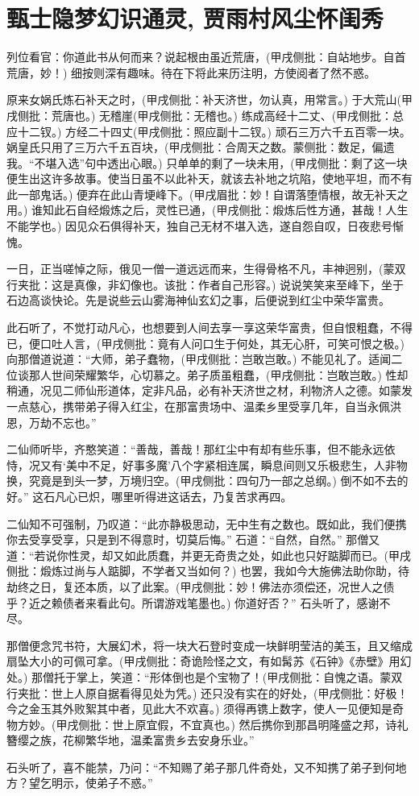 \chapter{甄士隐梦幻识通灵, 贾雨村风尘怀闺秀}

列位看官：你道此书从何而来？说起根由虽近荒唐，(甲戌侧批：自站地步。自首荒唐，妙！) 细按则深有趣味。待在下将此来历注明，方使阅者了然不惑。

原来女娲氏炼石补天之时，(甲戌侧批：补天济世，勿认真，用常言。) 于大荒山(甲戌侧批：荒唐也。) 无稽崖(甲戌侧批：无稽也。) 练成高经十二丈、(甲戌侧批：总应十二钗。) 方经二十四丈(甲戌侧批：照应副十二钗。) 顽石三万六千五百零一块。娲皇氏只用了三万六千五百块，(甲戌侧批：合周天之数。蒙侧批：数足，偏遗我。“不堪入选”句中透出心眼。) 只单单的剩了一块未用，(甲戌侧批：剩了这一块便生出这许多故事。使当日虽不以此补天，就该去补地之坑陷，使地平坦，而不有此一部鬼话。) 便弃在此山青埂峰下。(甲戌眉批：妙！自谓落堕情根，故无补天之用。) 谁知此石自经煅炼之后，灵性已通，(甲戌侧批：煅炼后性方通，甚哉！人生不能学也。) 因见众石俱得补天，独自己无材不堪入选，遂自怨自叹，日夜悲号惭愧。

一日，正当嗟悼之际，俄见一僧一道远远而来，生得骨格不凡，丰神迥别，(蒙双行夹批：这是真像，非幻像也。该批：作者自己形容。) 说说笑笑来至峰下，坐于石边高谈快论。先是说些云山雾海神仙玄幻之事，后便说到红尘中荣华富贵。

此石听了，不觉打动凡心，也想要到人间去享一享这荣华富贵，但自恨粗蠢，不得已，便口吐人言，(甲戌侧批：竟有人问口生于何处，其无心肝，可笑可恨之极。) 向那僧道说道：“大师，弟子蠢物，(甲戌侧批：岂敢岂敢。) 不能见礼了。适闻二位谈那人世间荣耀繁华，心切慕之。弟子质虽粗蠢，(甲戌侧批：岂敢岂敢。) 性却稍通，况见二师仙形道体，定非凡品，必有补天济世之材，利物济人之德。如蒙发一点慈心，携带弟子得入红尘，在那富贵场中、温柔乡里受享几年，自当永佩洪恩，万劫不忘也。”

二仙师听毕，齐憨笑道：“善哉，善哉！那红尘中有却有些乐事，但不能永远依恃，况又有‘美中不足，好事多魔’八个字紧相连属，瞬息间则又乐极悲生，人非物换，究竟是到头一梦，万境归空。(甲戌侧批：四句乃一部之总纲。) 倒不如不去的好。” 这石凡心已炽，哪里听得进这话去，乃复苦求再四。

二仙知不可强制，乃叹道：“此亦静极思动，无中生有之数也。既如此，我们便携你去受享受享，只是到不得意时，切莫后悔。” 石道：“自然，自然。” 那僧又道：“若说你性灵，却又如此质蠢，并更无奇贵之处，如此也只好踮脚而已。(甲戌侧批：煅炼过尚与人踮脚，不学者又当如何？) 也罢，我如今大施佛法助你助，待劫终之日，复还本质，以了此案。(甲戌侧批：妙！佛法亦须偿还，况世人之债乎？近之赖债者来看此句。所谓游戏笔墨也。) 你道好否？” 石头听了，感谢不尽。

那僧便念咒书符，大展幻术，将一块大石登时变成一块鲜明莹洁的美玉，且又缩成扇坠大小的可佩可拿。(甲戌侧批：奇诡险怪之文，有如髯苏《石钟》《赤壁》用幻处。) 那僧托于掌上，笑道：“形体倒也是个宝物了！(甲戌侧批：自愧之语。蒙双行夹批：世上人原自据看得见处为凭。) 还只没有实在的好处，(甲戌侧批：好极！今之金玉其外败絮其中者，见此大不欢喜。) 须得再镌上数字，使人一见便知是奇物方妙。(甲戌侧批：世上原宜假，不宜真也。) 然后携你到那昌明隆盛之邦，诗礼簪缨之族，花柳繁华地，温柔富贵乡去安身乐业。” 

石头听了，喜不能禁，乃问：“不知赐了弟子那几件奇处，又不知携了弟子到何地方？望乞明示，使弟子不惑。”
